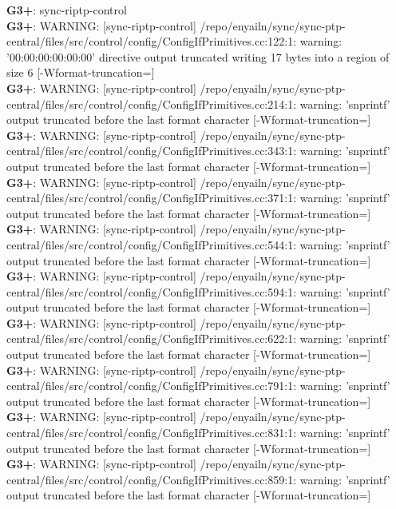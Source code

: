 \documentclass[12pt,twoside]{article}
\begin{document}
\textbf{G3+}: sync-riptp-control\\ 
\textbf{G3+}: WARNING: [sync-riptp-control] /repo/enyailn/sync/sync-ptp-central/files/src/control/config/ConfigIfPrimitives.cc:122:1: warning: '00:00:00:00:00:00' directive output truncated writing 17 bytes into a region of size 6 [-Wformat-truncation=]\\ 
\textbf{G3+}: WARNING: [sync-riptp-control] /repo/enyailn/sync/sync-ptp-central/files/src/control/config/ConfigIfPrimitives.cc:214:1: warning: 'snprintf' output truncated before the last format character [-Wformat-truncation=]\\ 
\textbf{G3+}: WARNING: [sync-riptp-control] /repo/enyailn/sync/sync-ptp-central/files/src/control/config/ConfigIfPrimitives.cc:343:1: warning: 'snprintf' output truncated before the last format character [-Wformat-truncation=]\\ 
\textbf{G3+}: WARNING: [sync-riptp-control] /repo/enyailn/sync/sync-ptp-central/files/src/control/config/ConfigIfPrimitives.cc:371:1: warning: 'snprintf' output truncated before the last format character [-Wformat-truncation=]\\ 
\textbf{G3+}: WARNING: [sync-riptp-control] /repo/enyailn/sync/sync-ptp-central/files/src/control/config/ConfigIfPrimitives.cc:544:1: warning: 'snprintf' output truncated before the last format character [-Wformat-truncation=]\\ 
\textbf{G3+}: WARNING: [sync-riptp-control] /repo/enyailn/sync/sync-ptp-central/files/src/control/config/ConfigIfPrimitives.cc:594:1: warning: 'snprintf' output truncated before the last format character [-Wformat-truncation=]\\ 
\textbf{G3+}: WARNING: [sync-riptp-control] /repo/enyailn/sync/sync-ptp-central/files/src/control/config/ConfigIfPrimitives.cc:622:1: warning: 'snprintf' output truncated before the last format character [-Wformat-truncation=]\\ 
\textbf{G3+}: WARNING: [sync-riptp-control] /repo/enyailn/sync/sync-ptp-central/files/src/control/config/ConfigIfPrimitives.cc:791:1: warning: 'snprintf' output truncated before the last format character [-Wformat-truncation=]\\ 
\textbf{G3+}: WARNING: [sync-riptp-control] /repo/enyailn/sync/sync-ptp-central/files/src/control/config/ConfigIfPrimitives.cc:831:1: warning: 'snprintf' output truncated before the last format character [-Wformat-truncation=]\\ 
\textbf{G3+}: WARNING: [sync-riptp-control] /repo/enyailn/sync/sync-ptp-central/files/src/control/config/ConfigIfPrimitives.cc:859:1: warning: 'snprintf' output truncated before the last format character [-Wformat-truncation=]\\ 
\end{document}
